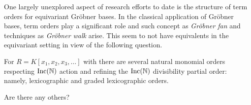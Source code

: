 
One largely unexplored aspect of research efforts to date is the structure of term orders for equivariant Gr\"obner bases.  In the classical application of Gr\"obner bases, term orders play a significant role and such concept as \emph{Gr\"obner fan} and techniques as \emph{Gr\"obner walk} arise. This seem to not have equivalents in the equivariant setting in view of the following question.  

\begin{question} For $R = K[x_1,x_2,x_3,\ldots]$ with there are several natural monomial orders respecting $\operatorname{Inc}(\mathbb N)$ action and refining the $\operatorname{Inc}(\mathbb N)$ divisibility partial order: namely, lexicographic and graded lexicographic orders.

Are there any others?
\end{question}




